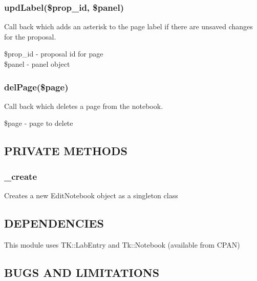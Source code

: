 \documentclass{article}
\begin{document}
\subsubsection*{updLabel(\$prop\_id, \$panel)\label{EditNotebook_updLabel_prop_id_panel_}}


Call back which adds an asterisk to the page label if there are unsaved
changes for the proposal.

\begin{description}

\item[{\$prop\_id - proposal id for page}] \mbox{}
\item[{\$panel - panel object}] \mbox{}\end{description}
\subsubsection*{delPage(\$page)\label{EditNotebook_delPage_page_}}


Call back which deletes a page from the notebook.

\begin{description}

\item[{\$page - page to delete}] \mbox{}\end{description}
\subsection*{PRIVATE METHODS\label{EditNotebook_PRIVATE_METHODS}}
\subsubsection*{\_create\label{EditNotebook__create}}


Creates a new EditNotebook object as a singleton class

\subsection*{DEPENDENCIES\label{EditNotebook_DEPENDENCIES}}


This module uses TK::LabEntry and Tk::Notebook (available from CPAN)

\subsection*{BUGS AND LIMITATIONS\label{EditNotebook_BUGS_AND_LIMITATIONS}}
\end{document}
